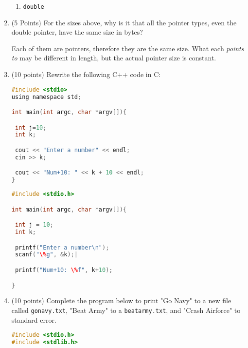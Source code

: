 \documentclass{article}[9pt]
\newenvironment{answerfont}{\fontfamily{qhv}\selectfont}{\par}
\newenvironment{myanswer}{\begin{mdframed}\begin{answerfont}}{\end{answerfont}\end{mdframed}}
\begin{document}
\begin{enumerate}
\begin{enumerate}
\item \texttt{double}

\begin{myanswer}
8
\end{myanswer}


\end{enumerate}

\item (5 Points) For the sizes above, why is it that all the pointer types, even
the double pointer, have the same size in bytes?


\begin{myanswer}
Each of them are pointers, therefore they are the same size.  What each
\textit{points to} may be different in length, but the actual pointer
size is constant.
\end{myanswer}


\item (10 points) Rewrite the following C++ code in C:

\begin{lstlisting}[language=c]
#include <stdio>
using namespace std;

int main(int argc, char *argv[]){

 int j=10;
 int k;

 cout << "Enter a number" << endl;
 cin >> k;

 cout << "Num+10: " << k + 10 << endl;
}
\end{lstlisting}

\begin{myanswer}
\begin{lstlisting}[language=c]
#include <stdio.h>

int main(int argc, char *argv[]){

 int j = 10;
 int k;

 printf("Enter a number\n");
 scanf("\%g", &k);|

 printf("Num+10: \%f", k+10);

}
\end{lstlisting}
\end{myanswer}



\item (10 points) Complete the program below to print "Go Navy" to a new file
called \texttt{gonavy.txt}, "Beat Army" to a \texttt{beatarmy.txt}, and "Crash
Airforce" to standard error. 

\begin{lstlisting}[language=c]
#include <stdio.h>
#include <stdlib.h>


\end{lstlisting}
\end{enumerate}
\end{document}
